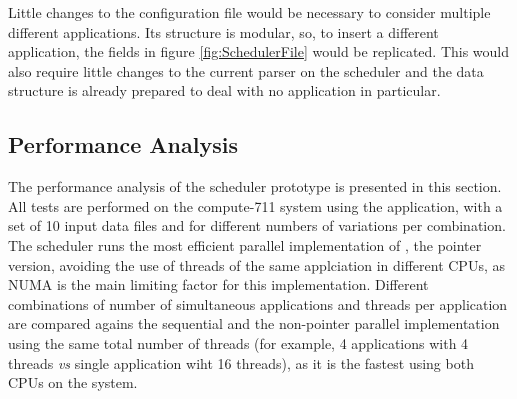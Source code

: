 Little changes to the configuration file would be necessary to consider multiple different applications. Its structure is modular, so, to insert a different application, the fields in figure \ref{fig:SchedulerFile} would be replicated. This would also require little changes to the current parser on the scheduler and the data structure is already prepared to deal with no application in particular.

\subsection{Performance Analysis}
\label{SchedulerPerformance}

The performance analysis of the scheduler prototype is presented in this section. All tests are performed on the compute-711 system using the \tth application, with a set of 10 input data files and for different numbers of variations per combination. The scheduler runs the most efficient parallel implementation of \tth, the pointer version, avoiding the use of threads of the same applciation in different CPUs, as NUMA is the main limiting factor for this implementation. Different combinations of number of simultaneous applications and threads per application are compared agains the sequential \tth and the non-pointer parallel implementation using the same total number of threads (for example, 4 applications with 4 threads \textit{vs} single application wiht 16 threads), as it is the fastest using both CPUs on the system.

